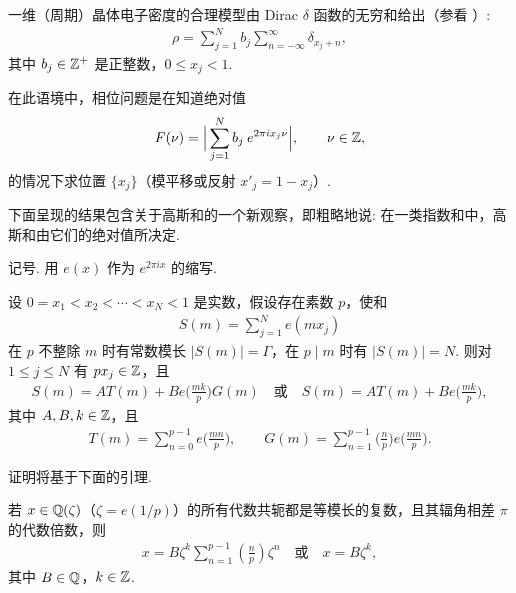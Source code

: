一维（周期）晶体电子密度的合理模型由 Dirac $\delta$ 函数的无穷和给出（参看 \cite{b158}）:
\begin{align*}
  \rho=\sum_{j=1}^{N}b_{j}\sum_{n=-\infty}^{\infty}\delta_{x_{j}+n},
\end{align*}
其中 $b_j \in \mathbb{Z}^+$ 是正整数，$0 \leq x_j < 1$.

在此语境中，相位问题是在知道绝对值
\begin{align*}
  F(\nu)=\Big|\sum_{j=1}^{N}b_{j}\:e^{2\pi i x_{j}\nu}\Big|,\qquad \nu\in\mathbb{Z},
\end{align*}
的情况下求位置 $\{x_j\}$（模平移或反射 $x'_j = 1 - x_j$）.

下面呈现的结果包含关于高斯和的一个新观察，即粗略地说: 在一类指数和中，高斯和由它们的绝对值所决定.

记号. 用 $e(x)$ 作为 $e^{2\pi i x}$ 的缩写.

\begin{theorem}\label{thm:7.7}
设 $0 = x_1 < x_2 < \cdots < x_N < 1$ 是实数，假设存在素数 $p$，使和
\begin{align*}
  S(m)=\sum_{j=1}^{N}e(m x_{j})
\end{align*}
在 $p$ 不整除 $m$ 时有常数模长 $|S(m)| = \Gamma$，在 $p \mid m$ 时有 $|S(m)| = N$. 则对 $1 \leq j \leq N$ 有 $px_j \in \mathbb{Z}$，且
\begin{align*}
  S(m)=AT(m)+Be\Big(\frac{mk}{p}\Big)G(m)\quad\text{或}\quad
  S(m)=AT(m)+Be\Big(\frac{mk}{p}\Big),
\end{align*}
其中 $A, B, k \in \mathbb{Z}$，且
\begin{align*}
  T(m)=\sum_{n=0}^{p-1}e\Big(\frac{mn}{p}\Big),\qquad
  G(m)=\sum_{n=1}^{p-1}\Big(\frac{n}{p}\Big)e\Big(\frac{mn}{p}\Big).
\end{align*}
\end{theorem}

证明将基于下面的引理.

\begin{lemma}\label{lem:7.8}
若 $x \in \mathbb{Q}(\zeta)$（$\zeta = e(1/p)$）的所有代数共轭都是等模长的复数，且其辐角相差 $\pi$ 的代数倍数，则
\begin{align*}
  x=B\zeta^{k}\sum_{n=1}^{p-1}\left(\frac{n}{p}\right)\zeta^{n}\quad\text{或}\quad
  x=B\zeta^{k},
\end{align*}
其中 $B \in \mathbb{Q}$，$k \in \mathbb{Z}$.
\end{lemma}

